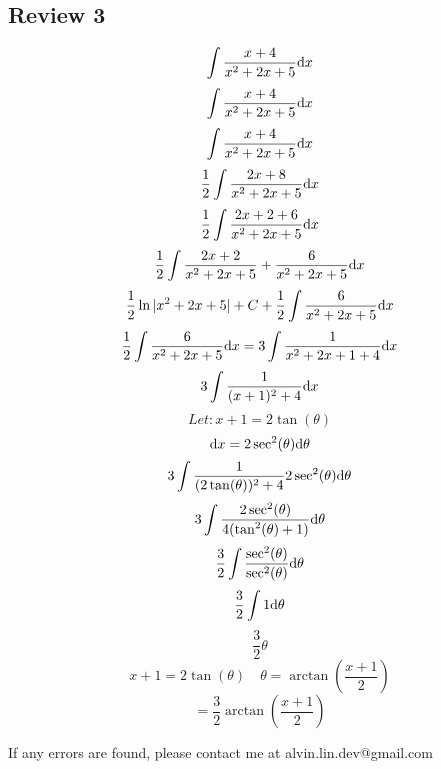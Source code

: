 \documentclass[letterpaper, 12pt]{math}
\begin{document}
\subsection*{Review 3}
\[ \int{\frac{x+4}{x^{2}+2x+5}\mathrm{d}{x}} \]
\[ \int{\frac{x+4}{x^{2}+2x+5}\mathrm{d}{x}} \]
\[ \int{\frac{x+4}{x^{2}+2x+5}\mathrm{d}{x}} \]
\[ \frac{1}{2}\int{\frac{2x+8}{x^{2}+2x+5}\mathrm{d}{x}} \]
\[ \frac{1}{2}\int{\frac{2x+2+6}{x^{2}+2x+5}\mathrm{d}{x}} \]
\[ \frac{1}{2}\int{\frac{2x+2}{x^{2}+2x+5}+\frac{6}{x^{2}+2x+5}\mathrm{d}{x}} \]
\[ \frac{1}{2}\ln|x^{2}+2x+5|+C+\frac{1}{2}\int{\frac{6}{x^{2}+2x+5}\mathrm{d}{x}} \]
\[ \frac{1}{2}\int{\frac{6}{x^{2}+2x+5}\mathrm{d}{x}} =
   3\int{\frac{1}{x^{2}+2x+1+4}\mathrm{d}{x}} \]
\[ 3\int{\frac{1}{(x+1)^{2}+4}\mathrm{d}{x}} \]
\[ Let: x+1 = 2\tan(\theta) \]
\[ \mathrm{d}{x} = 2\sec^{2}(\theta)\mathrm{d}{\theta} \]
\[ 3\int{\frac{1}{(2\tan(\theta))^{2}+4}2\sec^{2}(\theta)\mathrm{d}{\theta}} \]
\[ 3\int{\frac{2\sec^{2}(\theta)}{4(\tan^{2}(\theta)+1)}\mathrm{d}{\theta}} \]
\[ \frac{3}{2}\int{\frac{\sec^{2}(\theta)}{\sec^{2}(\theta)}\mathrm{d}{\theta}} \]
\[ \frac{3}{2}\int{1\mathrm{d}{\theta}} \]
\[ \frac{3}{2}\theta \]
\[ x+1 = 2\tan(\theta) \quad \theta = \arctan(\frac{x+1}{2}) \]
\[ = \frac{3}{2}\arctan(\frac{x+1}{2}) \]

\begin{center}
  If any errors are found, please contact me at alvin.lin.dev@gmail.com
\end{center}
\end{document}
